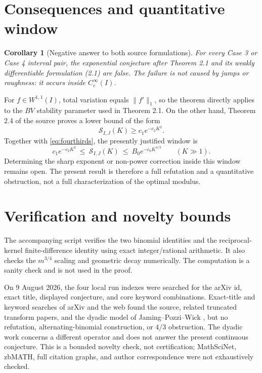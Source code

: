 \documentclass[11pt]{article}
\newtheorem{corollary}[theorem]{Corollary}
\begin{document}
\section{Consequences and quantitative window}

\begin{corollary}[Negative answer to both source formulations]
For every Case 3 or Case 4 interval pair, the exponential conjecture after
Theorem 2.1 and its weakly differentiable formulation (2.1) are false.  The
failure is not caused by jumps or roughness: it occurs inside
$C_c^\infty(I)$.
\end{corollary}

For $f\in W^{1,1}(I)$, total variation equals $\|f'\|_1$, so the theorem
directly applies to the $BV$ stability parameter used in Theorem 2.1.  On the
other hand, Theorem 2.4 of the source proves a lower bound of the form
\[
 \mathcal S_{I,J}(K)\ge c_1e^{-c_2K^2}.
\]
Together with \eqref{eq:fourthirds}, the presently justified window is
\[
 c_1e^{-c_2K^2}
 \ \le\ \mathcal S_{I,J}(K)
 \ \le\ B_0e^{-c_0K^{4/3}}
 \qquad(K\gg1).
\]
Determining the sharp exponent or non-power correction inside this window
remains open.  The present result is therefore a full refutation and a
quantitative obstruction, not a full characterization of the optimal modulus.

\section{Verification and novelty bounds}

The accompanying script  verifies the
two binomial identities and the reciprocal-kernel finite-difference identity
using exact integer/rational arithmetic.  It also checks the $m^{3/4}$ scaling
and geometric decay numerically.  The computation is a sanity check and is
not used in the proof.

On 9 August 2026, the four local run indexes were searched for the arXiv id,
exact title, displayed conjecture, and core keyword combinations.  Exact-title
and keyword searches of arXiv and the web found the source, related truncated
transform papers, and the dyadic model of Jaming--Pozzi--Wick \cite{dyadic},
but no refutation, alternating-binomial construction, or $4/3$ obstruction.
The dyadic work concerns a different operator and does not answer the present
continuous conjecture.  This is a bounded novelty check, not certification;
MathSciNet, zbMATH, full citation graphs, and author correspondence were not
exhaustively checked.
\end{document}
